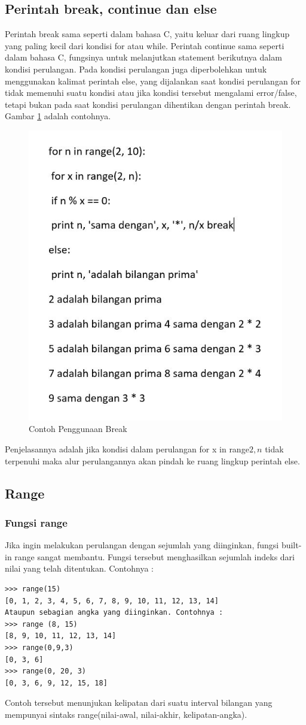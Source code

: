 \subsection{Perintah break, continue dan else}
 Perintah break sama seperti dalam bahasa C, yaitu keluar dari ruang lingkup yang paling kecil dari
kondisi for atau while.
Perintah continue sama  seperti dalam bahasa C, fungsinya untuk melanjutkan statement
berikutnya dalam kondisi perulangan.
Pada kondisi perulangan juga diperbolehkan untuk menggunakan kalimat perintah else, yang dijalankan saat kondisi perulangan for tidak memenuhi suatu kondisi atau jika kondisi tersebut mengalami error/false, tetapi bukan pada saat kondisi perulangan dihentikan dengan perintah break. Gambar \ref{2bce} adalah contohnya.


\begin{figure}[ht]
    \centerline{\includegraphics[width=.5\textwidth]{figures/2bce.JPG}}
    \caption{Contoh Penggunaan Break}
    \label{2bce}
    \end{figure}

Penjelasannya adalah jika kondisi dalam perulangan for x in range\(2, n\) tidak terpenuhi maka alur perulangannya akan pindah ke ruang lingkup perintah else. 

\subsection{Range}
\subsubsection{Fungsi range\(\)}
Jika ingin melakukan perulangan dengan sejumlah yang diinginkan, fungsi built-in range sangat membantu. Fungsi tersebut menghasilkan sejumlah indeks dari nilai yang telah ditentukan. 
Contohnya :
\begin{verbatim}
>>> range(15)
[0, 1, 2, 3, 4, 5, 6, 7, 8, 9, 10, 11, 12, 13, 14]
Ataupun sebagian angka yang diinginkan. Contohnya :
>>> range (8, 15)
[8, 9, 10, 11, 12, 13, 14]
>>> range(0,9,3)
[0, 3, 6]
>>> range(0, 20, 3)
[0, 3, 6, 9, 12, 15, 18]
\end{verbatim}
 Contoh tersebut menunjukan kelipatan dari suatu interval bilangan yang mempunyai sintaks range(nilai-awal, nilai-akhir, kelipatan-angka).
